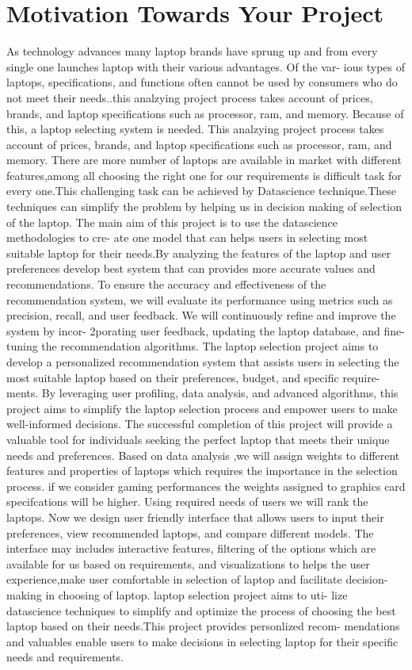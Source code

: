 \section{Motivation Towards Your Project}
As technology advances many laptop brands have sprung up and from every single one launches laptop with
their various advantages. Of the var- ious types of laptops, specifications, and functions often cannot be used
by consumers who do not meet their needs..this analzying project process takes account of prices, brands, and
laptop specifications such as processor, ram, and memory. Because of this, a laptop selecting system is needed.
This analzying project process takes account of prices, brands, and laptop specifications such as processor,
ram, and memory. There are more number of laptops are available in market with different features,among all
choosing the right one for our requirements is difficult task for every one.This challenging task can be achieved by
Datascience technique.These techniques can simplify the problem by helping us in decision making of selection
of the laptop. The main aim of this project is to use the datascience methodologies to cre- ate one model that
can helps users in selecting most suitable laptop for their needs.By analyzing the features of the laptop and
user preferences develop best system that can provides more accurate values and recommendations. To ensure
the accuracy and effectiveness of the recommendation system, we will evaluate its performance using metrics
such as precision, recall, and user feedback. We will continuously refine and improve the system by incor-
2porating user feedback, updating the laptop database, and fine-tuning the recommendation algorithms. The
laptop selection project aims to develop a personalized recommendation system that assists users in selecting
the most suitable laptop based on their preferences, budget, and specific require- ments. By leveraging user
profiling, data analysis, and advanced algorithms, this project aims to simplify the laptop selection process
and empower users to make well-informed decisions. The successful completion of this project will provide a
valuable tool for individuals seeking the perfect laptop that meets their unique needs and preferences.
Based on data analysis ,we will assign weights to different features and properties of laptops which requires
the importance in the selection process. if we consider gaming performances the weights assigned to graphics
card specifcations will be higher. Using required needs of users we will rank the laptops.
Now we design user friendly interface that allows users to input their preferences, view recommended laptops,
and compare different models. The interface may includes interactive features, filtering of the options which are
available for us based on requirements, and visualizations to helps the user experience,make user comfortable
in selection of laptop and facilitate decision-making in choosing of laptop. laptop selection project aims to
uti- lize datascience techniques to simplify and optimize the process of choosing the best laptop based on their
needs.This project provides personlized recom- mendations and valuables enable users to make decisions in
selecting laptop for their specific needs and requirements.
